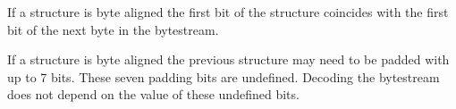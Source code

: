 If a structure is byte aligned the first bit of the structure coincides
with the first bit of the next byte in the bytestream.

If a structure is byte aligned the previous structure may need to be
padded with up to 7 bits. These seven padding bits are undefined.
Decoding the bytestream does not depend on the value of these undefined
bits.
